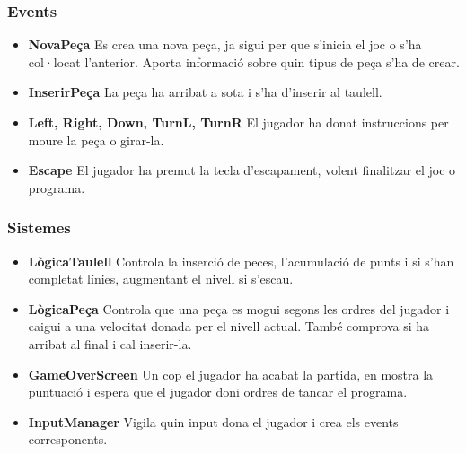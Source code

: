     \subsubsection{Events}

      \begin{itemize}
        \item {\bf NovaPeça}
          Es crea una nova peça, ja sigui per que s'inicia el joc o s'ha col·locat l'anterior. Aporta informació sobre quin tipus de peça s'ha de crear.
          
        \item {\bf InserirPeça}
          La peça ha arribat a sota i s'ha d'inserir al taulell.
          
        \item {\bf Left, Right, Down, TurnL, TurnR}
          El jugador ha donat instruccions per moure la peça o girar-la.
          
        \item {\bf Escape}
          El jugador ha premut la tecla d'escapament, volent finalitzar el joc o programa.
          
      \end{itemize}

    \subsubsection{Sistemes}

      \begin{itemize}
        \item {\bf LògicaTaulell}
          Controla la inserció de peces, l'acumulació de punts i si s'han completat línies, augmentant el nivell si s'escau.
          
        \item {\bf LògicaPeça}
          Controla que una peça es mogui segons les ordres del jugador i caigui a una velocitat donada per el nivell actual. També comprova si ha arribat al final i cal inserir-la.
          
        \item {\bf GameOverScreen}
          Un cop el jugador ha acabat la partida, en mostra la puntuació i espera que el jugador doni ordres de tancar el programa.
          
        \item {\bf InputManager}
          Vigila quin input dona el jugador i crea els events corresponents.
          
      \end{itemize}
      
